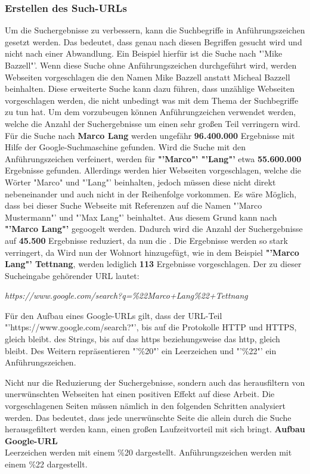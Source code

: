 		\subsubsection{Erstellen des Such-URLs}
		Um die Suchergebnisse zu verbessern, kann die Suchbegriffe in Anführungszeichen gesetzt werden. Das bedeutet, dass genau nach diesen Begriffen gesucht wird und nicht nach einer Abwandlung. Ein Beispiel hierfür ist die Suche nach "'Mike Bazzell"'. Wenn diese Suche ohne Anführungszeichen durchgeführt wird, werden Webseiten vorgeschlagen die den Namen Mike Bazzell anstatt Micheal Bazzell beinhalten. Diese erweiterte Suche kann dazu führen, dass unzählige Webseiten vorgeschlagen werden, die nicht unbedingt was mit dem Thema der Suchbegriffe zu tun hat. Um dem vorzubeugen können Anführungzeichen verwendet werden, welche die Anzahl der Suchergebnisse um einen sehr großen Teil verringern wird.\\
		Für die Suche nach \textbf{Marco Lang} werden ungefähr \textbf{96.400.000} Ergebnisse mit Hilfe der Google-Suchmaschine gefunden. Wird die Suche mit den Anführungszeichen verfeinert, werden für \textbf{"'Marco"' "'Lang"'} etwa \textbf{55.600.000} Ergebnisse gefunden. Allerdings werden hier Webseiten vorgeschlagen, welche die Wörter "Marco" und "'Lang"' beinhalten, jedoch müssen diese nicht direkt nebeneinander und auch nicht in der Reihenfolge vorkommen. Es wäre Möglich, dass bei dieser Suche Webseite mit Referenzen auf die Namen "'Marco Mustermann"' und "'Max Lang"' beinhaltet. Aus diesem Grund kann nach \textbf{"'Marco Lang"'} gegoogelt werden. Dadurch wird die Anzahl der Suchergebnisse auf \textbf{45.500} Ergebnisse reduziert, da nun die . Die Ergebnisse werden so stark verringert, da Wird nun der Wohnort hinzugefügt, wie in dem Beispiel \textbf{"'Marco Lang"' Tettnang}, werden lediglich \textbf{113} Ergebnisse vorgeschlagen. Der zu dieser Sucheingabe gehörender URL lautet:
		
		\textit{https://www.google.com/search?q=\%22Marco+Lang\%22+Tettnang}
		
		Für den Aufbau eines Google-URLs gilt, dass der URL-Teil "'https://www.google.com/search?"', bis auf die Protokolle HTTP und HTTPS, gleich bleibt. des Strings, bis auf das https beziehungsweise das http, gleich bleibt. Des Weitern repräsentieren "'\%20"' ein Leerzeichen und "'\%22"' ein Anführungszeichen. 
		
		Nicht nur die Reduzierung der Suchergebnisse, sondern auch das herausfiltern von unerwünschten Webseiten hat einen positiven Effekt auf diese Arbeit. Die vorgeschlagenen Seiten müssen nämlich in den folgenden Schritten analysiert werden. Das bedeutet, dass jede unerwünschte Seite die allein durch die Suche herausgefiltert werden kann, einen großen Laufzeitvorteil mit sich bringt. 
		\textbf{Aufbau Google-URL}\\
		Leerzeichen werden mit einem \%20 dargestellt. Anführungszeichen werden mit einem \%22 dargestellt.

